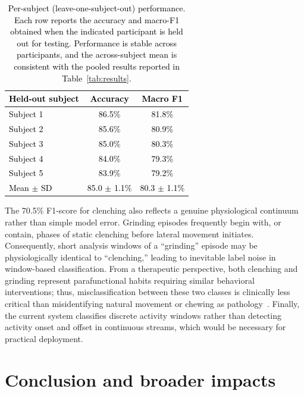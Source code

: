 \documentclass[pdflatex,sn-nature,iicol]{sn-jnl}
\newcommand{\rev}[1]{\textcolor{black}{#1}}
\begin{document}
\begin{table}[h]
  \caption{\rev{Per-subject (leave-one-subject-out) performance. Each row reports the accuracy and macro-F1 obtained when the indicated participant is held out for testing. Performance is stable across participants, and the across-subject mean is consistent with the pooled results reported in Table~\ref{tab:results}.}}
  \label{tab:persubject}
  \centering
  \begin{tabular*}{\columnwidth}{@{\extracolsep{\fill}}lcc@{}}
    \toprule
    \rev{Held-out subject} & \rev{Accuracy} & \rev{Macro F1} \\
    \midrule
    \rev{Subject 1} & \rev{86.5\%} & \rev{81.8\%} \\
    \rev{Subject 2} & \rev{85.6\%} & \rev{80.9\%} \\
    \rev{Subject 3} & \rev{85.0\%} & \rev{80.3\%} \\
    \rev{Subject 4} & \rev{84.0\%} & \rev{79.3\%} \\
    \rev{Subject 5} & \rev{83.9\%} & \rev{79.2\%} \\
    \midrule
    \rev{Mean $\pm$ SD} & \rev{85.0 $\pm$ 1.1\%} & \rev{80.3 $\pm$ 1.1\%} \\
    \bottomrule
  \end{tabular*}
\end{table}

The 70.5\% F1-score for clenching also reflects a genuine physiological continuum rather than simple model error. Grinding episodes frequently begin with, or contain, phases of static clenching before lateral movement initiates. Consequently, short analysis windows of a ``grinding'' episode may be physiologically identical to ``clenching,'' leading to inevitable label noise in window-based classification. From a therapeutic perspective, both clenching and grinding represent parafunctional habits requiring similar behavioral interventions; thus, misclassification between these two classes is clinically less critical than misidentifying natural movement or chewing as pathology~\cite{lobbezoo2018international}. Finally, the current system classifies discrete activity windows rather than detecting activity onset and offset in continuous streams, which would be necessary for practical deployment.

\section{Conclusion and broader impacts}
\end{document}
